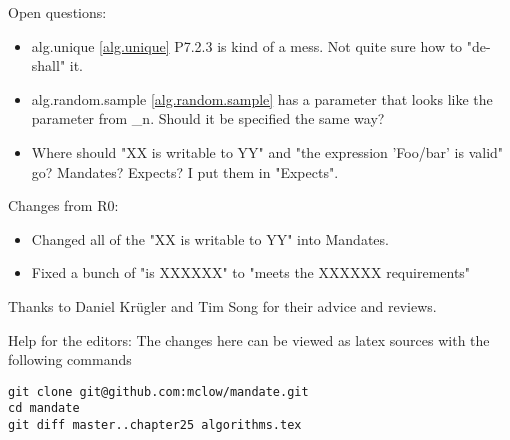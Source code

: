 Open questions:
\begin{itemize}
\item{alg.unique \ref{alg.unique} P7.2.3 is kind of a mess. Not quite sure how to "de-shall" it.}
\item{alg.random.sample \ref{alg.random.sample} has a  parameter that looks like the  parameter from \*_n. Should it be specified the same way?}
\item{Where should "XX is writable to YY" and "the expression 'Foo/bar' is valid" go? Mandates? Expects? I put them in "Expects".}
\end{itemize}


Changes from R0:
\begin{itemize}
\item{Changed all of the "XX is writable to YY" into Mandates.}
\item{Fixed a bunch of "is XXXXXX" to "meets the XXXXXX requirements"}
\end{itemize}

Thanks to Daniel Krügler and Tim Song for their advice and reviews.
 
\vfill
Help for the editors: The changes here can be viewed as latex sources with the following commands
\begin{verbatim}
git clone git@github.com:mclow/mandate.git
cd mandate
git diff master..chapter25 algorithms.tex
\end{verbatim}
